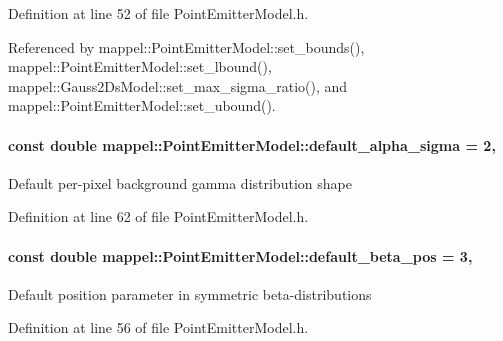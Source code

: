Definition at line 52 of file Point\+Emitter\+Model.\+h.



Referenced by mappel\+::\+Point\+Emitter\+Model\+::set\+\_\+bounds(), mappel\+::\+Point\+Emitter\+Model\+::set\+\_\+lbound(), mappel\+::\+Gauss2\+Ds\+Model\+::set\+\_\+max\+\_\+sigma\+\_\+ratio(), and mappel\+::\+Point\+Emitter\+Model\+::set\+\_\+ubound().

\paragraph[{\texorpdfstring{default\+\_\+alpha\+\_\+sigma}{default_alpha_sigma}}]{\setlength{\rightskip}{0pt plus 5cm}const double mappel\+::\+Point\+Emitter\+Model\+::default\+\_\+alpha\+\_\+sigma = 2\hspace{0.3cm}{\ttfamily [static]}, {\ttfamily [inherited]}}\hypertarget{classmappel_1_1PointEmitterModel_a0d9f2c5438940f329e75708987e8b343}{}\label{classmappel_1_1PointEmitterModel_a0d9f2c5438940f329e75708987e8b343}
Default per-\/pixel background gamma distribution shape 

Definition at line 62 of file Point\+Emitter\+Model.\+h.

\paragraph[{\texorpdfstring{default\+\_\+beta\+\_\+pos}{default_beta_pos}}]{\setlength{\rightskip}{0pt plus 5cm}const double mappel\+::\+Point\+Emitter\+Model\+::default\+\_\+beta\+\_\+pos = 3\hspace{0.3cm}{\ttfamily [static]}, {\ttfamily [inherited]}}\hypertarget{classmappel_1_1PointEmitterModel_a9b64c3b4b97ac2805340c0779c71398c}{}\label{classmappel_1_1PointEmitterModel_a9b64c3b4b97ac2805340c0779c71398c}
Default position parameter in symmetric beta-\/distributions 

Definition at line 56 of file Point\+Emitter\+Model.\+h.

